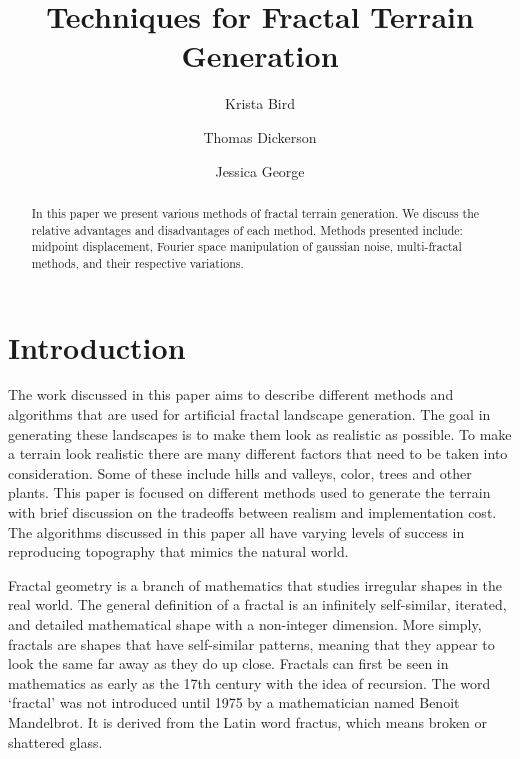 \documentclass[11pt,twocolumn]{article}
\title{Techniques for Fractal Terrain Generation}
\author{Krista Bird \and Thomas Dickerson \and Jessica George}
\begin{document}
    \maketitle

    \begin{abstract}
    In this paper we present various methods of fractal terrain generation.
	We discuss the relative advantages and disadvantages of each method. Methods presented include: midpoint displacement,
	Fourier space manipulation of gaussian noise, multi-fractal methods, and their respective variations. 
    \end{abstract}
     
    \section{Introduction}
	\label{sec:intro}
	The work discussed in this paper aims to describe different methods and algorithms that are used for artificial fractal
	landscape generation.  The goal in generating these landscapes is to make them look as realistic as possible.
	To make a terrain look realistic there are many different factors that need to be taken into consideration.
	Some of these include hills and valleys, color, trees and other plants. This paper is focused
	on different methods used to generate the terrain with brief discussion on the tradeoffs between realism and implementation cost.
	The algorithms discussed in this paper all have varying levels of success in reproducing topography that mimics the natural world. 

	Fractal geometry is a branch of mathematics that studies irregular shapes in the real world. The general definition of a
	fractal is an infinitely self-similar, iterated, and detailed mathematical shape with a non-integer dimension. More simply,
	fractals are shapes that have self-similar patterns, meaning that they appear to look the same far away as they do up close.
	Fractals can first be seen in mathematics as early as the 17th century with the idea of recursion.  The word `fractal' was not
	introduced until 1975 by a mathematician named Benoit Mandelbrot. It is derived from the Latin word fractus, which means broken
	or shattered glass. 
\end{document}
